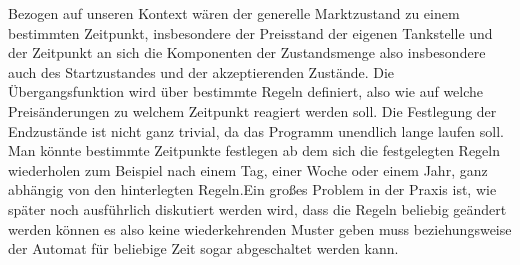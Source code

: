 \documentclass[12pt,a4paper,bibliography=totocnumbered,listof=totocnumbered]{scrartcl}
\begin{document}
Bezogen auf unseren Kontext wären der generelle Marktzustand zu einem bestimmten Zeitpunkt, insbesondere der Preisstand der eigenen Tankstelle und der Zeitpunkt an sich die Komponenten der Zustandsmenge also insbesondere auch des Startzustandes und der akzeptierenden Zustände.
Die Übergangsfunktion wird über bestimmte Regeln definiert, also wie auf welche Preisänderungen zu welchem Zeitpunkt reagiert werden soll. Die Festlegung der Endzustände ist nicht ganz trivial, da das Programm unendlich lange laufen soll. Man könnte bestimmte Zeitpunkte festlegen ab dem sich die festgelegten Regeln wiederholen zum Beispiel nach einem Tag, einer Woche oder einem Jahr, ganz abhängig von den hinterlegten Regeln.Ein großes Problem in der Praxis ist, wie später noch ausführlich diskutiert werden wird, dass die Regeln beliebig geändert werden können es also keine wiederkehrenden Muster geben muss beziehungsweise der Automat für beliebige Zeit sogar abgeschaltet werden kann.

\end{document}
